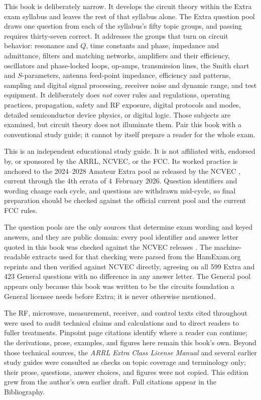 This book is deliberately narrow. It develops the circuit theory within the Extra
exam syllabus and leaves the rest of that syllabus alone. The Extra question pool
draws one question from each of the syllabus's fifty topic groups, and passing
requires thirty-seven correct. It
addresses the groups that turn on circuit behavior: resonance and \(Q\), time
constants and phase, impedance and admittance, filters and matching networks,
amplifiers and their efficiency, oscillators and phase-locked loops, op-amps,
transmission lines, the Smith chart and \(S\)-parameters, antenna feed-point
impedance, efficiency and patterns, sampling and digital signal processing,
receiver noise and dynamic range, and test equipment. It deliberately does
\emph{not} cover rules and regulations, operating practices, propagation,
safety and RF exposure, digital protocols and modes, detailed semiconductor
device physics, or digital logic. Those subjects are examined, but circuit theory
does not illuminate them. Pair this book with a conventional study guide; it
cannot by itself prepare a reader for the whole exam.

This is an independent educational study guide. It is not affiliated with,
endorsed by, or sponsored by the ARRL, NCVEC, or the FCC. Its worked practice
is anchored to the 2024--2028 Amateur Extra pool as released by the NCVEC
\cite{ncvec_extra_2024}, current through the 4th errata of 4~February 2026.
Question identifiers and wording change each cycle, and questions are
withdrawn mid-cycle, so final preparation should be checked against the
official current pool and the current FCC rules.

The question pools are the only sources that determine exam wording and keyed
answers, and they are public domain: every pool identifier and answer letter
quoted in this book was checked against the NCVEC releases
\cite{ncvec_extra_2024,ncvec_general_2023}. The machine-readable extracts used
for that checking were parsed from the HamExam.org reprints \cite{hamexam} and
then verified against NCVEC directly, agreeing on all 599 Extra and 423
General questions with no difference in any answer letter. The General pool
appears only because this book was written to be the circuits foundation a
General licensee needs before Extra; it is never otherwise mentioned.

The RF, microwave, measurement, receiver, and control texts cited throughout
were used to audit technical claims and calculations and to direct readers to
fuller treatments. Pinpoint page citations identify where a reader can continue;
the derivations, prose, examples, and figures here remain this book's own. Beyond
those technical sources, the \emph{ARRL Extra Class License Manual}
\cite{arrl_extra_12} and several earlier study guides
\cite{romanchik_extra_2016,shellhamer_extra_2017,extra_pool_2020} were
consulted as checks on topic coverage and terminology only; their prose,
questions, answer choices, and figures were not copied. This edition grew from
the author's own earlier draft. Full citations appear in the Bibliography.
